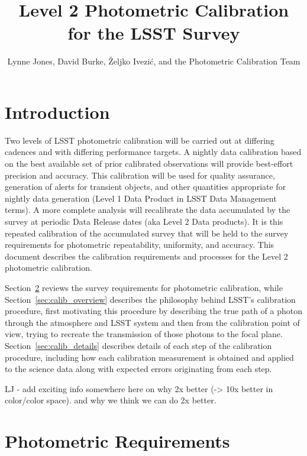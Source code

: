 \documentclass[12pt,preprint]{aastex}
\begin{document}
\title{Level 2 Photometric Calibration for the LSST Survey}

\author{
Lynne Jones, David Burke, \v{Z}eljko Ivezi\'{c}, and the Photometric Calibration Team
}



\section{Introduction}


Two levels of LSST photometric calibration will be carried out at
differing cadences and with differing performance targets. A nightly
data calibration based on the best available set of prior calibrated
observations will provide best-effort precision and accuracy. This
calibration will be used for quality assurance, generation of alerts
for transient objects, and other quantities appropriate for nightly
data generation (Level 1 Data Product in LSST Data Management terms).
A more complete analysis will recalibrate the data accumulated by the
survey at periodic Data Release dates (aka Level 2 Data products).  It
is this repeated calibration of the accumulated survey that will be
held to the survey requirements for photometric repeatability,
uniformity, and accuracy.  This document describes the calibration
requirements and processes for the Level 2 photometric calibration.

Section~\ref{sec:photoreq} reviews the survey requirements for
photometric calibration, while Section~\ref{sec:calib_overview}
describes the philosophy behind LSST's calibration procedure, first
motivating this procedure by describing the true path of a photon
through the atmosphere and LSST system and then from the calibration
point of view, trying to recreate the transmission of those photons to
the focal plane.  Section~\ref{sec:calib_details} describes details of
each step of the calibration procedure, including how each calibration
measurement is obtained and applied to the science data along with
expected errors originating from each step.

LJ - add exciting info somewhere here on why 2x better (-> 10x better in color/color
space). and why we think we can do 2x better. 

\section{Photometric Requirements}
\label{sec:photoreq}
\end{document}
